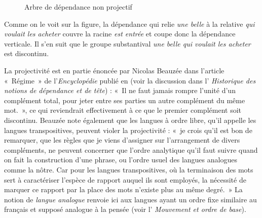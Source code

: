 \begin{figure}
\caption{\label{fig:nonproj-belle}Arbre de dépendance non projectif}
\end{figure}



Comme on le voit sur la figure, la dépendance qui relie \textit{une belle} à la relative \textit{qui voulait les acheter} couvre la racine \textit{est entrée} et coupe donc la dépendance verticale. Il s’en suit que le groupe substantival \textit{une belle qui voulait les acheter} est discontinu.

La projectivité est en partie énoncée par Nicolas Beauzée dans l’article «~Régime~» de l’\textit{Encyclopédie} publié en \citeyear{Beauzée1765} (voir la discussion dans l’ \textit{Historique des notions de dépendance et de tête}) : «~Il ne faut jamais rompre l’unité d’un complément total, pour jeter entre ses parties un autre complément du même mot.~», ce qui reviendrait effectivement à ce que le premier complément soit discontinu. Beauzée note également que les langues à ordre libre, qu'il appelle les langues transpositives, peuvent violer la projectivité : «~je crois qu’il est bon de remarquer, que les règles que je viens d’assigner sur l’arrangement de divers compléments, ne peuvent concerner que l’ordre analytique qu’il faut suivre quand on fait la construction d’une phrase, ou l’ordre usuel des langues analogues comme la nôtre. Car pour les langues transpositives, où la terminaison des mots sert à caractériser l’espèce de rapport auquel ils sont employés, la nécessité de marquer ce rapport par la place des mots n’existe plus au même degré.~» La notion de \textit{langue analogue} renvoie ici aux langues ayant un ordre fixe similaire au français et supposé analogue à la pensée (voir l’ \textit{Mouvement et ordre de base}).


